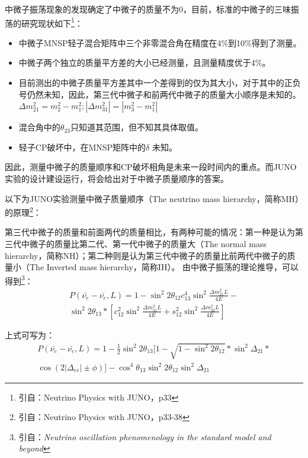 \documentclass[10pt,a4paper]{article}
\begin{document}
中微子振荡现象的发现确定了中微子的质量不为0，目前，标准的中微子的三味振荡的研究现状如下{\footnote{引自：Neutrino Physics with JUNO，p33}}：
\begin{itemize}
	\item{中微子MNSP轻子混合矩阵中三个非零混合角在精度在4\%到10\%得到了测量。}
    \item{中微子两个独立的质量平方差的大小已经测量，且测量精度优于4\%。}
    \item{目前测出的中微子质量平方差其中一个差得到的仅为其大小，对于其中的正负号仍然未知，因此，第三代中微子和前两代中微子的质量大小顺序是未知的。$\Delta m_{21}^2=m_{2}^2-m_{1}^2;|\Delta m_{31}^2|=|m_{3}^2-m_{1}^2|$}
    \item{混合角中的$\theta_{23}$只知道其范围，但不知其具体取值。}
    \item{轻子CP破坏中，在MNSP矩阵中的$\delta$ 未知。}
\end{itemize}

因此，测量中微子的质量顺序和CP破坏相角是未来一段时间内的重点。而JUNO实验的设计建设运行，将会给出对于中微子质量顺序的答案。

以下为JUNO实验测量中微子质量顺序（The neutrino mass hierarchy，简称MH）的原理{\footnote{引自：Neutrino Physics with JUNO，p33-38}}：

第三代中微子的质量和前面两代的质量相比，有两种可能的情况：第一种是认为第三代中微子的质量比第二代、第一代中微子的质量大（The normal mass hierarchy，简称NH）；第二种则是认为第三代中微子的质量比前两代中微子的质量小（The Inverted mass hierarchy，简称IH）。
由中微子振荡的理论推导，可以得到\footnote{引自：\itshape{Neutrino oscillation phenomenology  in the standard model and beyond}  }：
\[
 \begin{split}
    \label{E1}
     P(\bar{\nu_e}-\bar{\nu_e},L)=1-{\sin^2{2\theta_{12}}} c_{13}^4\sin^2{\frac{\Delta{m_{21}^2}L}{4E}}-\\
\sin^2{2\theta_{13}} *[c_{12}^2\sin^2{\frac{\Delta{m_{31}^2}L}{4E}}+s_{12}^2\sin^2{\frac{\Delta{m_{32}^2}L}{4E}}]
 \end{split}
 \]

上式可写为：
 \begin{equation}
 \begin{split}
    \label{E1}
     P(\bar{\nu_e}-\bar{\nu_e},L)=1-\frac{1}{2}{\sin^2{2\theta_{13}}}[1-\sqrt{1-\sin^2{2\theta_{12}}}*\sin^2{\Delta_{21}}*\\\cos(2|\Delta_{ee}|\pm\phi)] -\cos^4{\theta_{13}}\sin^2{2\theta_{12}}\sin^2{\Delta_{21}} 
 \end{split}
 \end{equation}
\end{document}
